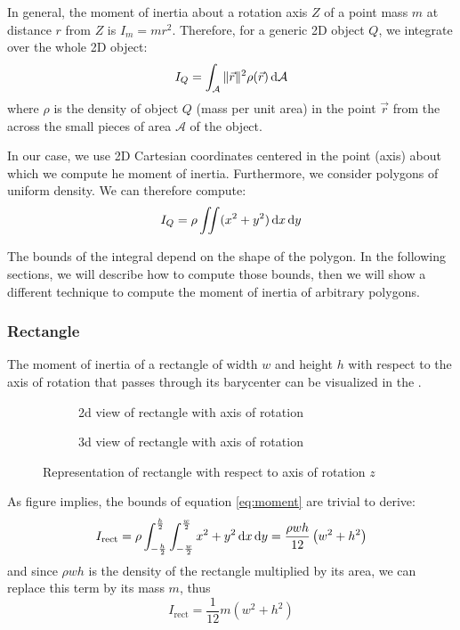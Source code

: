 In general, the moment of inertia about a rotation axis $Z$ of a point
mass $m$ at distance $r$ from $Z$ is $I_m=mr^2$.  Therefore, for a
generic 2D object $Q$, we integrate over the whole 2D object:
\begin{equation}
	\label{eq:moment_general}
	I_Q = \int_{\mathcal{A}}\|\vec r\|^2 \rho(\vec r) \mathop{}\!\mathrm{d} \mathcal{A}
\end{equation}
where $\rho$ is the density of object $Q$ (mass per unit area) in the
point $\vec r$ from the across the small pieces of area $\mathcal A$
of the object.

In our case, we use 2D Cartesian coordinates centered in the point
(axis) about which we compute he moment of inertia.  Furthermore, we
consider polygons of uniform density.  We can therefore compute:
\begin{equation}
	\label{eq:moment}
	I_Q = \rho \iint(x^2 + y^2)\mathop{}\!\mathrm{d} x\mathop{}\!\mathrm{d} y
\end{equation}

The bounds of the integral depend on the shape of the polygon. In the following
sections, we will describe how to compute those bounds, then we will show a
different technique to compute the moment of inertia of arbitrary polygons.

\subsubsection{Rectangle}
The moment of inertia of a rectangle of width $w$ and height $h$ with respect to
the axis of rotation that passes through its barycenter can be visualized in the
.

\begin{figure}[H]
	\centering
	\hfill
	\begin{subfigure}[]{.4\textwidth}
		\centering
		\caption{2d view of rectangle with axis of rotation}
		\label{fig:rectangle_inertia2d}
	\end{subfigure}
	\hfill
	\begin{subfigure}[]{.4\textwidth}
		\centering
		\caption{3d view of rectangle with axis of rotation}
		\label{fig:rectangle_inertia3d}
	\end{subfigure}
	\hfill\null
	\caption{Representation of rectangle with respect to axis of rotation $z$}
	\label{fig:rectangle_inertia}
\end{figure}

As figure  implies, the bounds of equation
\ref{eq:moment} are trivial to derive:
\begin{equation}
	\label{eq:rect_moment}
	I_{\text{rect}} = \rho \int_{-\frac{h}{2}}^{\frac{h}{2}}
	\int_{-\frac{w}{2}}^{\frac{w}{2}}  x^2 + y^2 \mathop{}\!\mathrm{d} x \mathop{}\!\mathrm{d} y
	= \frac{\rho wh}{12} \left( w^2 + h^2 \right)
\end{equation}
and since $\rho w h$ is the density of the rectangle multiplied by its area, we
can replace this term by its mass $m$, thus
\begin{equation}
	I_{\text{rect}} = \frac{1}{12} m\left(w^2 + h^2\right)
\end{equation}

